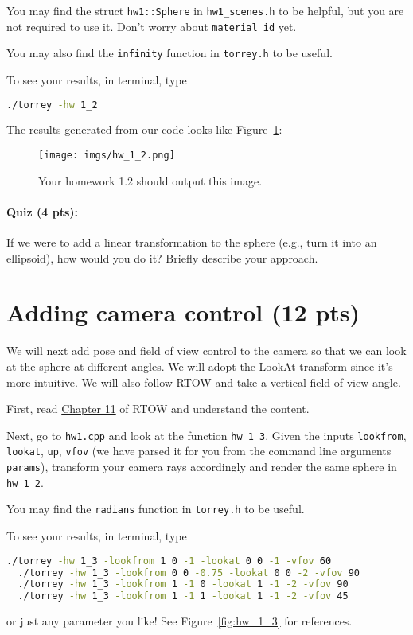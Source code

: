 You may find the struct \lstinline{hw1::Sphere} in \lstinline{hw1_scenes.h} to be helpful, but you are not required to use it. Don't worry about \lstinline{material_id} yet.

You may also find the \lstinline{infinity} function in \lstinline{torrey.h} to be useful.

To see your results, in terminal, type
\begin{lstlisting}[language=bash]
  ./torrey -hw 1_2
\end{lstlisting}

The results generated from our code looks like Figure~\ref{fig:hw_1_2}:
\begin{figure}[ht]
    \centering
    \texttt{[image: imgs/hw\_1\_2.png]}
    \caption{Your homework 1.2 should output this image.}
    \label{fig:hw_1_2}
\end{figure}

\paragraph{Quiz (4 pts):} If we were to add a linear transformation to the sphere (e.g., turn it into an ellipsoid), how would you do it? Briefly describe your approach.

\section{Adding camera control (12 pts)}
We will next add pose and field of view control to the camera so that we can look at the sphere at different angles. We will adopt the LookAt transform since it's more intuitive. We will also follow RTOW and take a vertical field of view angle.

First, read \href{https://raytracing.github.io/books/RayTracingInOneWeekend.html#positionablecamera}{Chapter 11} of RTOW and understand the content.

Next, go to \lstinline{hw1.cpp} and look at the function \lstinline{hw_1_3}. Given the inputs \lstinline{lookfrom}, \lstinline{lookat}, \lstinline{up}, \lstinline{vfov} (we have parsed it for you from the command line arguments \lstinline{params}), transform your camera rays accordingly and render the same sphere in \lstinline{hw_1_2}.

You may find the \lstinline{radians} function in \lstinline{torrey.h} to be useful.

To see your results, in terminal, type
\begin{lstlisting}[language=bash]
  ./torrey -hw 1_3 -lookfrom 1 0 -1 -lookat 0 0 -1 -vfov 60
  ./torrey -hw 1_3 -lookfrom 0 0 -0.75 -lookat 0 0 -2 -vfov 90
  ./torrey -hw 1_3 -lookfrom 1 -1 0 -lookat 1 -1 -2 -vfov 90
  ./torrey -hw 1_3 -lookfrom 1 -1 1 -lookat 1 -1 -2 -vfov 45
\end{lstlisting}
or just any parameter you like! See Figure~\ref{fig:hw_1_3} for references.

